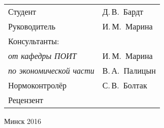 \begin{titlepage}
\begin{center}
    \begin{tabular}{ p{}p{} }
      Студент & Д.\,В.~Бардт \\
      Руководитель & И.\,М.~Марина \\
      Консультанты: &\\
      \hspace*{3ex}\emph{от кафедры ПОИТ} & И.\,М.~Марина \\
      \hspace*{3ex}\emph{по экономической части} & В.\,А.~Палицын \\
      Нормоконтролёр & С.\,В.~Болтак\\
      Рецензент &
    \end{tabular}
    
    \vfill
    {\normalsize Минск 2016}
  \end{center}
\end{titlepage}
